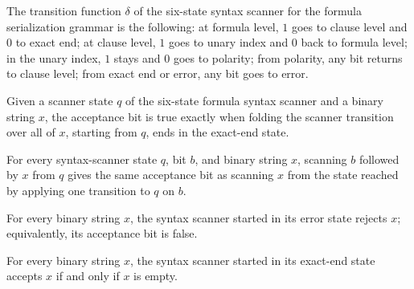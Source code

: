 \begin{definition}
\label{Complexity.tautSyntaxStep}
\leanok
{}
The transition function $\delta$ of the six-state syntax scanner for the formula
serialization grammar is the following: at formula level, $1$ goes to clause level and
$0$ to exact end; at clause level, $1$ goes to unary index and $0$ back to formula
level; in the unary index, $1$ stays and $0$ goes to polarity; from polarity, any bit
returns to clause level; from exact end or error, any bit goes to error.
\end{definition}

\begin{definition}
\label{Complexity.tautSyntaxAccept}
\leanok
{}
Given a scanner state $q$ of the six-state formula syntax scanner and a binary string
$x$, the acceptance bit is true exactly when folding the scanner transition over all
of $x$, starting from $q$, ends in the exact-end state.
\end{definition}

\begin{lemma}
\label{Complexity.taut_syntax_cons}
\leanok
{}
For every syntax-scanner state $q$, bit $b$, and binary string $x$, scanning $b$
followed by $x$ from $q$ gives the same acceptance bit as scanning $x$ from the state
reached by applying one transition to $q$ on $b$.
\end{lemma}

\begin{lemma}
\label{Complexity.taut_syntax_bad}
\leanok
{}
For every binary string $x$, the syntax scanner started in its error state rejects $x$;
equivalently, its acceptance bit is false.
\end{lemma}

\begin{lemma}
\label{Complexity.taut_syntax_done}
\leanok
{}
For every binary string $x$, the syntax scanner started in its exact-end state accepts
$x$ if and only if $x$ is empty.
\end{lemma}

